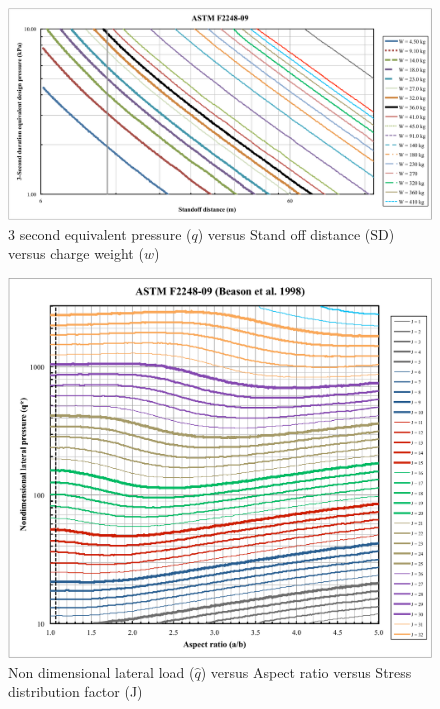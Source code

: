 \documentclass[12pt]{article}
\begin{document}
\begin{figure}[h!]
 \begin{center}
 \includegraphics[scale=0.5]{ASTM_F2248-09.pdf}
 \caption{3 second equivalent pressure ($q$) versus Stand off distance ($\text{SD}$) versus
   charge weight ($w$)}
\label{Fig_ASTM_F2248-09}
 \end{center}
 \end{figure}

 \begin{figure}[h!]
 \begin{center}
 \includegraphics[scale=0.7]{ASTM_F2248-09_BeasonEtAl.pdf}
 \caption{Non dimensional lateral load ($\hat{q}$) versus Aspect ratio versus
   Stress distribution factor (J)}
\label{ASTM_F2248-09_BeasonEtAl}
 \end{center}
 \end{figure}
\end{document}

